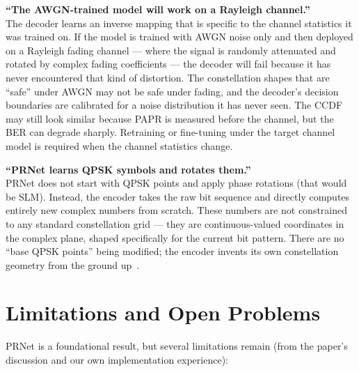 \begin{misconception}
    \textbf{``The AWGN-trained model will work on a Rayleigh channel.''} \\
    The decoder learns an inverse mapping that is specific to the channel
    statistics it was trained on.  If the model is trained with AWGN noise
    only and then deployed on a Rayleigh fading channel --- where the signal
    is randomly attenuated and rotated by complex fading coefficients --- the
    decoder will fail because it has never encountered that kind of
    distortion.  The constellation shapes that are ``safe'' under AWGN
    may not be safe under fading, and the decoder's decision boundaries
    are calibrated for a noise distribution it has never seen.  The CCDF may
    still look similar because PAPR is measured before the channel, but the
    BER can degrade sharply.  Retraining or fine-tuning under the target
    channel model is required when the channel statistics change.
\end{misconception}

\begin{misconception}
    \textbf{``PRNet learns QPSK symbols and rotates them.''} \\
    PRNet does not start with QPSK points and apply phase rotations (that
    would be SLM).  Instead, the encoder takes the raw bit sequence and
    directly computes entirely new complex numbers from scratch.  These
    numbers are not constrained to any standard constellation grid ---
    they are continuous-valued coordinates in the complex plane, shaped
    specifically for the current bit pattern.  There are no ``base QPSK
    points'' being modified; the encoder invents its own constellation
    geometry from the ground up~\cite{kim2017novel}.
\end{misconception}


\section{Limitations and Open Problems}
\label{sec:prnet_limitations}

PRNet is a foundational result, but several limitations remain (from the
paper's discussion and our own implementation experience):

